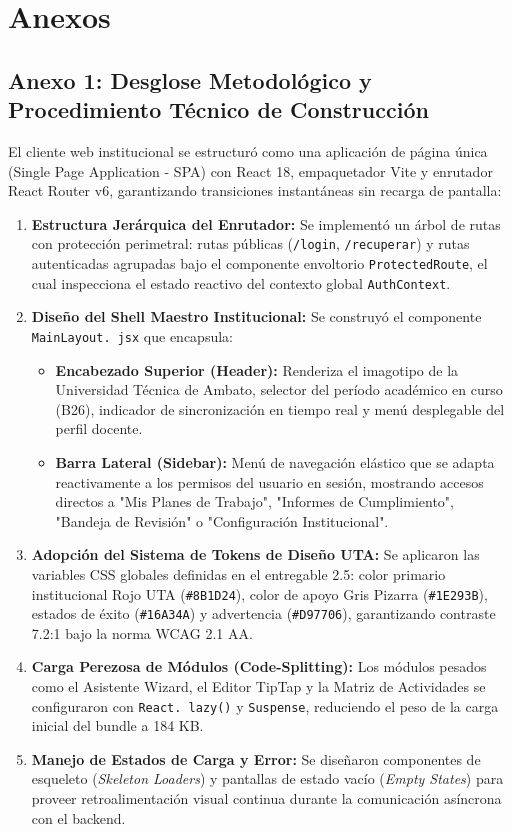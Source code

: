 \documentclass[12pt,a4paper]{article}
\begin{document}
\vspace{0.4cm}

\section{Anexos}

\subsection*{Anexo 1: Desglose Metodológico y Procedimiento Técnico de Construcción}
El cliente web institucional se estructuró como una aplicación de página única (Single Page Application - SPA) con React 18, empaquetador Vite y enrutador React Router v6, garantizando transiciones instantáneas sin recarga de pantalla:

\begin{enumerate}[leftmargin=1.5em, itemsep=3pt]
    \item \textbf{Estructura Jerárquica del Enrutador:} Se implementó un árbol de rutas con protección perimetral: rutas públicas (\texttt{/\allowbreak  login}, \texttt{/\allowbreak  recuperar}) y rutas autenticadas agrupadas bajo el componente envoltorio \texttt{ProtectedRoute}, el cual inspecciona el estado reactivo del contexto global \texttt{AuthContext}.
    \item \textbf{Diseño del Shell Maestro Institucional:} Se construyó el componente \texttt{MainLayout. jsx} que encapsula:
    \begin{itemize}[leftmargin=1.2em, itemsep=2pt]
        \item \textbf{Encabezado Superior (Header):} Renderiza el imagotipo de la Universidad Técnica de Ambato, selector del período académico en curso (B26), indicador de sincronización en tiempo real y menú desplegable del perfil docente.
        \item \textbf{Barra Lateral (Sidebar):} Menú de navegación elástico que se adapta reactivamente a los permisos del usuario en sesión, mostrando accesos directos a "Mis Planes de Trabajo", "Informes de Cumplimiento", "Bandeja de Revisión" o "Configuración Institucional".
    \end{itemize}
    \item \textbf{Adopción del Sistema de Tokens de Diseño UTA:} Se aplicaron las variables CSS globales definidas en el entregable 2.5: color primario institucional Rojo UTA (\texttt{\#8B1D24}), color de apoyo Gris Pizarra (\texttt{\#1E293B}), estados de éxito (\texttt{\#16A34A}) y advertencia (\texttt{\#D97706}), garantizando contraste 7.2:1 bajo la norma WCAG 2.1 AA.
    \item \textbf{Carga Perezosa de Módulos (Code-Splitting):} Los módulos pesados como el Asistente Wizard, el Editor TipTap y la Matriz de Actividades se configuraron con \texttt{React. lazy()} y \texttt{Suspense}, reduciendo el peso de la carga inicial del bundle a 184 KB.
    \item \textbf{Manejo de Estados de Carga y Error:} Se diseñaron componentes de esqueleto (\textit{Skeleton Loaders}) y pantallas de estado vacío (\textit{Empty States}) para proveer retroalimentación visual continua durante la comunicación asíncrona con el backend.
\end{enumerate}
\end{document}
